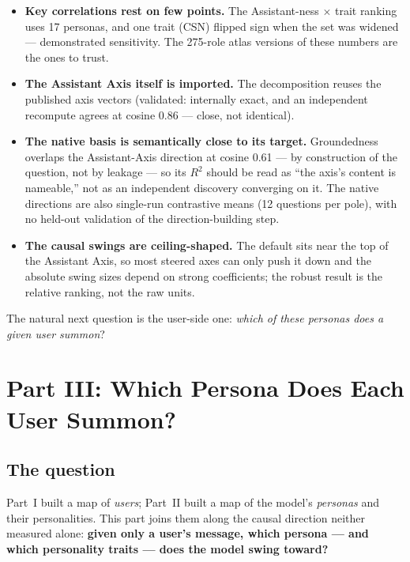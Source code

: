 \documentclass[11pt]{article}
\begin{document}
\begin{itemize}
        comparable to the parent paper's.
  \item \textbf{Key correlations rest on few points.} The Assistant-ness
        $\times$ trait ranking uses 17 personas, and one trait (CSN) flipped
        sign when the set was widened --- demonstrated sensitivity. The
        275-role atlas versions of these numbers are the ones to trust.
  \item \textbf{The Assistant Axis itself is imported.} The decomposition
        reuses the published axis vectors (validated: internally exact, and an
        independent recompute agrees at cosine 0.86 --- close, not identical).
  \item \textbf{The native basis is semantically close to its target.}
        Groundedness overlaps the Assistant-Axis direction at cosine 0.61 ---
        by construction of the question, not by leakage --- so its $R^2$
        should be read as ``the axis's content is nameable,'' not as an
        independent discovery converging on it. The native directions are also
        single-run contrastive means (12 questions per pole), with no
        held-out validation of the direction-building step.
  \item \textbf{The causal swings are ceiling-shaped.} The default sits near
        the top of the Assistant Axis, so most steered axes can only push it
        down and the absolute swing sizes depend on strong coefficients; the
        robust result is the relative ranking, not the raw units.
\end{itemize}

The natural next question is the
user-side one: \emph{which of these personas does a given user summon}?

\clearpage
\section{Part III: Which Persona Does Each User Summon?}

\subsection{The question}

Part~I built a map of \emph{users}; Part~II built a map of the model's
\emph{personas} and their personalities. This part joins them along the causal
direction neither measured alone: \textbf{given only a user's message, which
persona --- and which personality traits --- does the model swing toward?}
\end{document}

